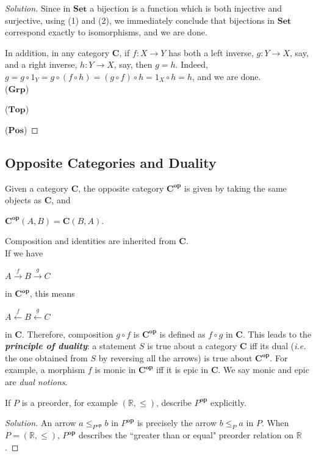 \documentclass[]{amsbook}
\newcommand{\catname}[1]{\mathbf{#1}}
\newcommand{\R}{\mathbb{R}}
\newcommand{\0}{\mathbf{0}}
\newcommand{\1}{\mathbf{1}}
\newenvironment{solution}
    {\begin{proof}[Solution]}{\end{proof}}
\begin{document}
\begin{solution}
    Since in $\catname{Set}$ a bijection is a function which is both injective
    and surjective, using (1) and (2), we immediately conclude that bijections
    in $\catname{Set}$ correspond exactly to isomorphisms, and we are done.

    In addition, in any category $\catname{C}$, if $f: X \to Y$ has both a left
    inverse, $g: Y \to X$, say, and a right inverse, $h: Y \to X$, say, then
    $g = h$. Indeed, $g = g \circ 1_Y = g \circ (f \circ h) = (g \circ f) \circ
    h = 1_X \circ h = h$, and we are done.\\

    ($\catname{Grp}$)

    ($\catname{Top}$)

    ($\catname{Pos}$)
\end{solution}

\subsection*{Opposite Categories and Duality}
Given a category $\catname{C}$, the opposite category $\catname{C}^{\mathbf{op}}$
is given by taking the same objects as $\catname{C}$, and
\begin{center}
    $\catname{C}^{\mathbf{op}}(A, B) = \catname{C}(B, A)$.
\end{center}

Composition and identities are inherited from $\catname{C}$.\\
If we have
\begin{center}
    $A \xrightarrow{f} B \xrightarrow{g} C$
\end{center}
in $\catname{C}^{\mathbf{op}}$, this means
\begin{center}
    $A \xleftarrow{f} B \xleftarrow{g} C$
\end{center}
in $\catname{C}$. Therefore, composition $ g \circ f$ is
$\catname{C}^{\mathbf{op}}$ is defined as $f \circ g$ in $\catname{C}$. This
leads to the \emph{\textbf{principle of duality}}: a statement $S$ is true
about a category $\catname{C}$ iff its dual (\emph{i.e.} the one obtained
from $S$ by reversing all the arrows) is true about $\catname{C}^{\mathbf{op}}$.
For example, a morphism $f$ is monic in $\catname{C}^{\mathbf{op}}$ iff it is
epic in $\catname{C}$. We say monic and epic are \emph{dual notions}.

\setcounter{Exercise}{13}
\begin{Exercise}
    If $P$ is a preorder, for example $(\R, \le)$, describe $P^{\mathbf{op}}$
    explicitly.
\end{Exercise}
\begin{solution}
    An arrow $a \le_{P^{\mathbf{op}}} b$ in $P^{\mathbf{op}}$ is precisely the
    arrow $b \le_P a$ in $P$. When $P = (\R, \le)$, $P^{\mathbf{op}}$ describes
    the ``greater than or equal" preorder relation on $\R$.
\end{solution}
\end{document}

